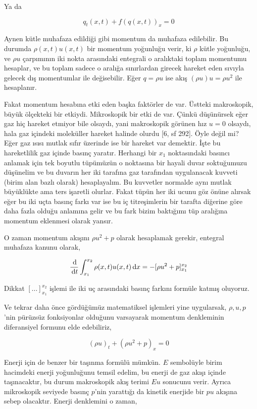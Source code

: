 \documentclass[12pt,fleqn]{article}\usepackage{../../common}
\begin{document}
Ya da

$$
q_t(x,t) + f(q(x,t))_x  = 0
$$

Aynen kütle muhafaza edildiği gibi momentum da muhafaza edilebilir. Bu durumda
$\rho(x,t) u(x,t)$ bir momentum yoğunluğu verir, ki $\rho$ kütle yoğunluğu, ve
$\rho u$ çarpımının iki nokta arasındaki entegrali o aralıktaki toplam momentumu
hesaplar, ve bu toplam sadece o aralığa sınırlardan girecek hareket eden sıvıyla
gelecek dış momentumlar ile değisebilir. Eğer $q = \rho u$ ise akış
$(\rho u) u = \rho u^2$ ile hesaplanır.

Fakat momentum hesabına etki eden başka faktörler de var. Üstteki makroskopik,
büyük ölçekteki bir etkiydi. Mikroskopik bir etki de var. Çünkü düşünürsek eğer
gaz hiç hareket etmiyor bile olsaydı, yani makroskopik görünen hız $u=0$
olsaydı, hala gaz içindeki moleküller hareket halinde olurdu [6, sf 292]. Öyle
değil mi?  Eğer gaz ısısı mutlak sıfır üzerinde ise bir hareket var
demektir. İşte bu hareketlilik gaz içinde basınç yaratır. Herhangi bir $x_1$
noktasındaki basıncı anlamak için tek boyutlu tüpümüzün o noktasına bir hayali
duvar soktuğumuzu düşünelim ve bu duvarın her iki tarafına gaz tarafından
uygulanacak kuvveti (birim alan bazlı olarak) hesaplayalım. Bu kuvvetler
normalde aynı mutlak büyüklükte ama ters işaretli olurlar. Fakat tüpün her
iki ucunu göz önüne alırsak eğer bu iki uçta basınç farkı var ise bu
iç titreşimlerin bir tarafta diğerine göre daha fazla olduğu anlamına gelir
ve bu fark bizim baktığımı tüp aralığına momentum eklenmesi olarak yansır.

O zaman momentum akışını $\rho u^2 + p$ olarak hesaplamak gerekir, entegral
muhafaza kanunu olarak,

$$
\frac{\,\mathrm{d}}{\,\mathrm{d} t} \int_{x_1}^{x_2} 
\rho(x,t) u(x,t) \,\mathrm{d} x = - [\rho u^2 + p]_{x_1}^{x_2}
$$

Dikkat $[ ... ]_{x_1}^{x_2}$ işlemi ile iki uç arasındaki basınç farkını
formüle katmış oluyoruz.

Ve tekrar daha önce gördüğümüz matematiksel işlemleri yine uygularsak,
$\rho,u,p$'nin pürüzsüz fonksiyonlar olduğunu varsayarak momentum denkleminin
diferansiyel formunu elde edebiliriz,

$$
(\rho u)_t + (\rho u^2 + p)_x = 0
$$

Enerji için de benzer bir taşınma formülü mümkün. $E$ sembolüyle birim hacimdeki
enerji yoğunluğunu temsil edelim, bu enerji de gaz akışı içinde taşınacaktır, bu
durum makroskopik akış terimi $E u$ sonucunu verir. Ayrıca mikroskopik seviyede
basınç $p$'nin yarattığı da kinetik enerjide bir $pu$ akışına sebep olacaktır.
Enerji denklemini o zaman,
\end{document}
